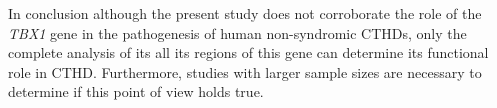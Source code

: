 \begin{refsection}
In conclusion although the present study does not corroborate the role of the \textit{TBX1} gene in the pathogenesis of human non-syndromic CTHDs, only the complete analysis of its all its regions of this gene can determine its functional role in CTHD. Furthermore, studies with larger sample sizes are necessary to determine if this point of view holds true.





\clearpage

\printbibliography[heading=subbibintoc]
\end{refsection}
